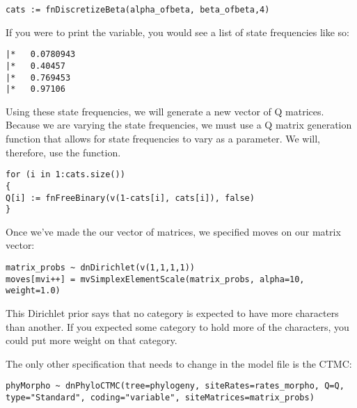 {\tt \begin{snugshade*}
\begin{lstlisting}
cats := fnDiscretizeBeta(alpha_ofbeta, beta_ofbeta,4)
\end{lstlisting}
\end{snugshade*}}

If you were to print the  variable, you would see a list of state frequencies like so:

{\tiny{\tt \begin{snugshade*}
\begin{lstlisting}
|*   0.0780943
|*   0.40457
|*   0.769453
|*   0.97106
\end{lstlisting}
\end{snugshade*}}}

Using these state frequencies, we will generate a new vector of Q matrices.
Because we are varying the state frequencies, we must use a Q matrix generation function that allows for state frequencies to vary as a parameter.
We will, therefore, use the  function.

{\tt \begin{snugshade*}
\begin{lstlisting}
for (i in 1:cats.size())
{
Q[i] := fnFreeBinary(v(1-cats[i], cats[i]), false)
}
\end{lstlisting}
\end{snugshade*}}

Once we've made the our vector of matrices, we specified moves on our matrix vector:
{\tt \begin{snugshade*}
\begin{lstlisting}
matrix_probs ~ dnDirichlet(v(1,1,1,1))
moves[mvi++] = mvSimplexElementScale(matrix_probs, alpha=10, weight=1.0) 
\end{lstlisting}
\end{snugshade*}}

This Dirichlet prior says that no category is expected to have more characters than another. If you expected some category to hold more of the characters, you could put more weight on that category. \par

The only other specification that needs to change in the model file is the CTMC:
{\tt \begin{snugshade*}
\begin{lstlisting}
phyMorpho ~ dnPhyloCTMC(tree=phylogeny, siteRates=rates_morpho, Q=Q, type="Standard", coding="variable", siteMatrices=matrix_probs)
\end{lstlisting}
\end{snugshade*}}


